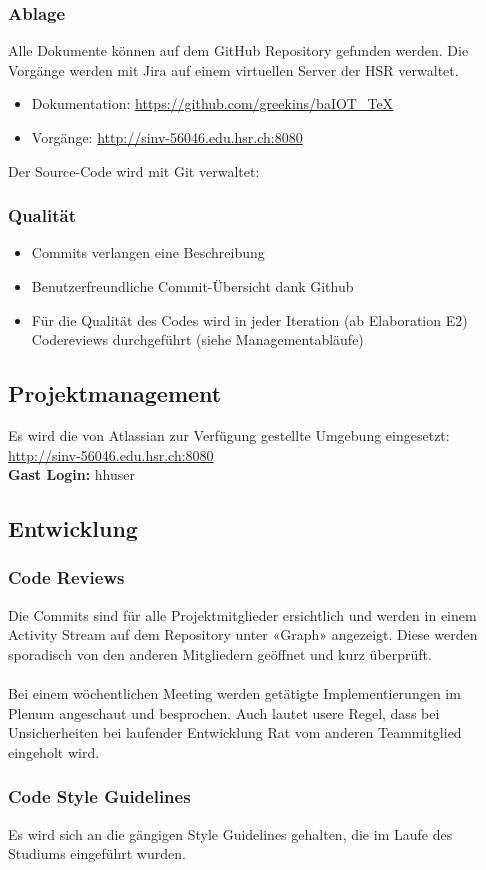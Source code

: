 		\subsubsection*{Ablage}
			Alle Dokumente können auf dem GitHub Repository gefunden werden. Die Vorgänge werden mit Jira auf einem virtuellen Server der HSR verwaltet.
			\begin{itemize}
				\item Dokumentation: \url{https://github.com/greekins/baIOT_TeX} 
				\item Vorgänge: \url{http://sinv-56046.edu.hsr.ch:8080}
			\end{itemize}
			Der Source-Code wird mit Git verwaltet: \tbd

		\subsubsection*{Qualität}
			\begin{itemize}
				\item Commits verlangen eine Beschreibung
				\item Benutzerfreundliche Commit-Übersicht dank Github
				\item Für die Qualität des Codes wird in jeder Iteration (ab Elaboration E2) Codereviews durchgeführt (siehe Managementabläufe)
			\end{itemize}

	\subsection*{Projektmanagement}
		Es wird die von Atlassian zur Verfügung gestellte Umgebung eingesetzt: \\
		\url{http://sinv-56046.edu.hsr.ch:8080} \\
		\textbf{Gast Login:} hhuser


	\subsection*{Entwicklung}
		\subsubsection*{Code Reviews}
			Die Commits sind für alle Projektmitglieder ersichtlich und werden in einem Activity Stream auf dem Repository unter 
			«Graph» angezeigt. Diese werden sporadisch von den anderen Mitgliedern geöffnet und kurz überprüft. \\
			\\
			Bei einem wöchentlichen Meeting werden getätigte Implementierungen im Plenum angeschaut und besprochen. Auch lautet usere 
			Regel, dass bei Unsicherheiten bei laufender Entwicklung Rat vom anderen Teammitglied eingeholt wird.

		\subsubsection*{Code Style Guidelines}
			Es wird sich an die gängigen Style Guidelines gehalten, die im Laufe des Studiums eingeführt wurden.
